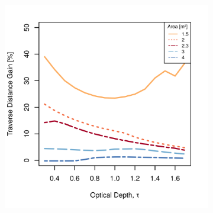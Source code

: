 \begin{figure}[h]
\captionsetup[subfigure]{justification=centering}
\vspace{-2ex}
	\centering
    \setlength{\subfigureWidth}{0.50\textwidth}
    \setlength{\graphicsHeight}{80mm}
    \hypersetup{hidelinks=true}%
    \begin{subfigure}[t]{\subfigureWidth}
        \centering
        \includegraphics[height=\graphicsHeight]{sections/power-system-design/solar-array/plots/ianichaos-75w-traverse-gains-for-different-solar-cell-coverage-areas.png}
		\label{fig:plot:sub:ismenius-chaos-flat-traverse-gains-for-different-sa-area}
    \end{subfigure}\hfill
    \begin{subfigure}[t]{\subfigureWidth}
        \centering

\end{subfigure}
\end{figure}

